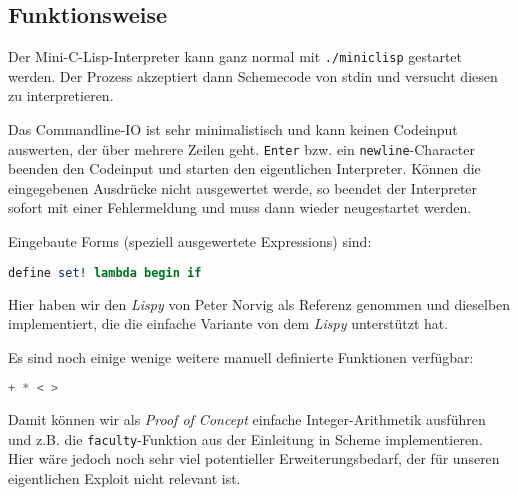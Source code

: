 \subsection[Funktionsweise]{Funktionsweise}
Der Mini-C-Lisp-Interpreter kann ganz normal mit \texttt{./miniclisp}
gestartet werden. Der Prozess akzeptiert dann Schemecode von stdin
und versucht diesen zu interpretieren.
\par
Das Commandline-IO ist sehr minimalistisch und kann keinen Codeinput
auswerten, der über mehrere Zeilen geht. \texttt{Enter} bzw. ein
\texttt{newline}-Character beenden den Codeinput und starten den eigentlichen
Interpreter. Können die eingegebenen Ausdrücke nicht ausgewertet werde, so
beendet der Interpreter sofort mit einer Fehlermeldung und muss dann wieder
neugestartet werden.
\par
Eingebaute Forms (speziell ausgewertete Expressions) sind:
\begin{lstlisting}[language=Scheme]
define set! lambda begin if
\end{lstlisting}
Hier haben wir den \emph{Lispy} von Peter Norvig als Referenz genommen und
dieselben implementiert, die die einfache Variante von dem \emph{Lispy}
unterstützt hat.
\par
Es sind noch einige wenige weitere manuell definierte Funktionen verfügbar:
\begin{lstlisting}[language=Scheme]
+ * < >
\end{lstlisting}
Damit können wir als \emph{Proof of Concept} einfache Integer-Arithmetik
ausführen und z.B. die \texttt{faculty}-Funktion aus der Einleitung in
Scheme implementieren. Hier wäre jedoch noch sehr viel potentieller
Erweiterungsbedarf, der für unseren eigentlichen Exploit nicht relevant ist.

